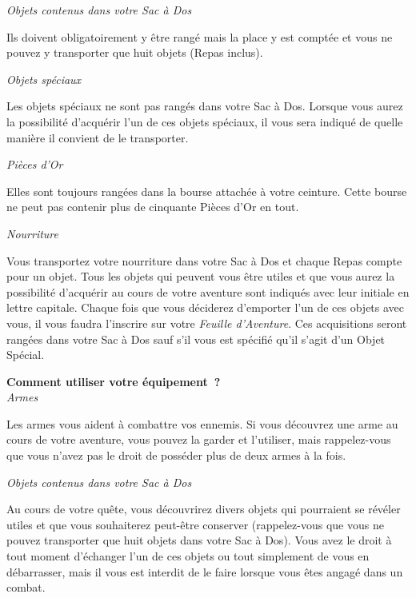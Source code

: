 \documentclass[11pt]{book}
\begin{document}
\begin{center}
  \textit{Objets contenus dans votre Sac à Dos}
\end{center}
Ils doivent obligatoirement y être rangé mais la place y est comptée et vous ne pouvez
y transporter que huit objets (Repas inclus).

\begin{center}
  \textit{Objets spéciaux}
\end{center}
Les objets spéciaux ne sont pas rangés dans votre Sac à Dos. Lorsque vous aurez
la possibilité d'acquérir l'un de ces objets spéciaux, il vous sera indiqué de
quelle manière il convient de le transporter.

\begin{center}
  \textit{Pièces d'Or}
\end{center}
Elles sont toujours rangées dans la bourse attachée à votre ceinture. Cette bourse
ne peut pas contenir plus de cinquante Pièces d'Or en tout.

\begin{center}
  \textit{Nourriture}
\end{center}
Vous transportez votre nourriture dans votre Sac à Dos et chaque Repas compte pour
un objet. Tous les objets qui peuvent vous être utiles et que vous aurez la possibilité
d'acquérir au cours de votre aventure sont indiqués avec leur initiale en lettre capitale.
Chaque fois que vous déciderez d'emporter l'un de ces objets avec vous, il vous
faudra l'inscrire sur votre \textit{Feuille d'Aventure}. Ces acquisitions seront
rangées dans votre Sac à Dos sauf s'il vous est spécifié qu'il s'agit d'un Objet Spécial.

\begin{center}
  \textbf{Comment utiliser votre équipement~?}\\
  \textit{Armes}
\end{center}
Les armes vous aident à combattre vos ennemis. Si vous découvrez une arme au cours
de votre aventure, vous pouvez la garder et l'utiliser, mais rappelez-vous que vous
n'avez pas le droit de posséder plus de deux armes à la fois.

\begin{center}
  \textit{Objets contenus dans votre Sac à Dos}
\end{center}
Au cours de votre quête, vous découvrirez divers objets qui pourraient se révéler
utiles et que vous souhaiterez peut-être conserver (rappelez-vous que vous ne pouvez
transporter que huit objets dans votre Sac à Dos). Vous avez le droit à tout moment
d'échanger l'un de ces objets ou tout simplement de vous en débarrasser, mais il vous
est interdit de le faire lorsque vous êtes angagé dans un combat.
\end{document}

